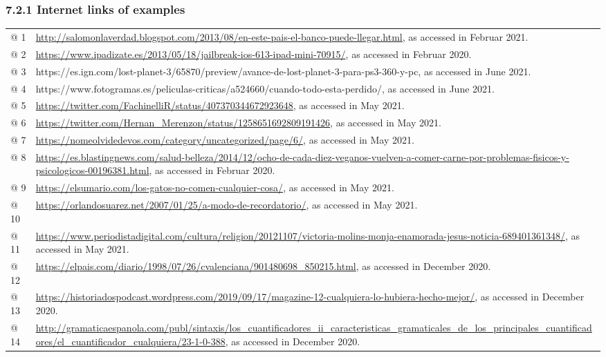 \subsubsection[7.2.1 Internet links of examples]{7.2.1 Internet links of examples}
\begin{flushleft}
\tablefirsthead{}
\tablehead{}
\tabletail{}
\tablelasttail{}
\begin{supertabular}{m{0.7955598in}m{5.35876in}}
@ 1  &
\url{http://salomonlaverdad.blogspot.com/2013/08/en-este-pais-el-banco-puede-llegar.html}, as accessed in Februar 2021.\\
@ 2  &
\url{https://www.ipadizate.es/2013/05/18/jailbreak-ios-613-ipad-mini-70915/}, as accessed in Februar 2020.\\
@ 3  &
https://es.ign.com/lost-planet-3/65870/preview/avance-de-lost-planet-3-para-ps3-360-y-pc, as accessed in June 2021.\\
@ 4  &
https://www.fotogramas.es/peliculas-criticas/a524660/cuando-todo-esta-perdido/, as accessed in June 2021.\\
@ 5  &
\url{https://twitter.com/FachinelliR/status/407370344672923648}, as accessed in May 2021.\\
@ 6  &
\url{https://twitter.com/Hernan_Merenzon/status/1258651692809191426}, as accessed in May 2021.\\
@ 7  &
\url{https://nomeolvidedevos.com/category/uncategorized/page/6/}, as accessed in May 2021.\\
@ 8  &
\url{https://es.blastingnews.com/salud-belleza/2014/12/ocho-de-cada-diez-veganos-vuelven-a-comer-carne-por-problemas-fisicos-y-psicologicos-00196381.html}, as accessed in Februar 2020.\\
@ 9  &
\url{https://elsumario.com/los-gatos-no-comen-cualquier-cosa/}, as accessed in May 2021.\\
@ 10  &
\url{https://orlandosuarez.net/2007/01/25/a-modo-de-recordatorio/}, as accessed in May 2021.\\
@ 11  &
\url{https://www.periodistadigital.com/cultura/religion/20121107/victoria-molins-monja-enamorada-jesus-noticia-689401361348/}, as accessed in May 2021.\\
@ 12  &
\url{https://elpais.com/diario/1998/07/26/cvalenciana/901480698_850215.html}, as accessed in December 2020. \\
@ 13  &
\url{https://historiadospodcast.wordpress.com/2019/09/17/magazine-12-cualquiera-lo-hubiera-hecho-mejor/}, as accessed in December 2020.\\
@ 14  &
\url{http://gramaticaespanola.com/publ/sintaxis/los_cuantificadores_ii_caracteristicas_gramaticales_de_los_principales_cuantificadores/el_cuantificador_cualquiera/23-1-0-388}, as accessed in December 2020.\\

\end{supertabular}
\end{flushleft}
